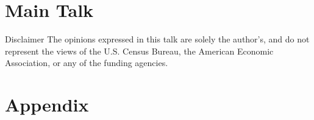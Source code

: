 \documentclass[xcolor=table,compress]{beamer}
\title[Containerized confidential data]{\mytitle}
\subtitle{\mysubtitle}
\author[Vilhuber]{%
  Lars~Vilhuber\inst{1} 
}
\institute[Cornell]{
  \inst{1}%
   Labor Dynamics Institute,
  ILR, Cornell University, United States
}%
\date{November 2022}
\begin{document}
\frame{\titlepage}

%


\part<presentation>{Main Talk}

\begin{frame}{Disclaimer}
    \footnotesize The opinions expressed in this talk are solely the author's, and do not represent the views of the U.S. Census Bureau, the American Economic Association, or any of the funding agencies. 
\end{frame}
%
%


\ifpdf
{}
\fi
\appendix
\part<presentation>{Appendix}


\ifpdf
{}
\fi
\end{document}
